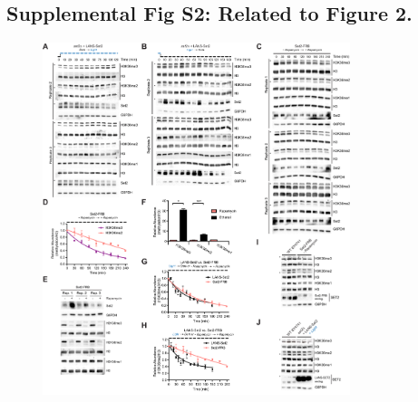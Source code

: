 \documentclass[11pt]{biorxiv}
\begin{document}
\subsection{Supplemental Fig S2: Related to Figure 2.}
\begin{figure}[ht!]
\center
\includegraphics[width=0.8\textwidth, trim={0in 0in 0in 0in}, clip]{figures/Supplemental_Fig_S2_compressed.pdf}
\end{figure}
\end{document}
